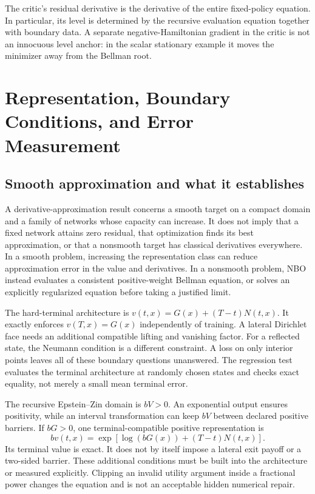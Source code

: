 \documentclass[ecta,nameyear,draft]{econsocart}
\theoremstyle{definition}
\theoremstyle{remark}
\begin{document}
The critic's residual derivative is the derivative of the entire fixed-policy equation. In particular, its level is determined by the recursive evaluation equation together with boundary data. A separate negative-Hamiltonian gradient in the critic is not an innocuous level anchor: in the scalar stationary example it moves the minimizer away from the Bellman root.

\section{Representation, Boundary Conditions, and Error Measurement}
\subsection{Smooth approximation and what it establishes}
A derivative-approximation result concerns a smooth target on a compact domain and a family of networks whose capacity can increase. It does not imply that a fixed network attains zero residual, that optimization finds its best approximation, or that a nonsmooth target has classical derivatives everywhere. In a smooth problem, increasing the representation class can reduce approximation error in the value and derivatives. In a nonsmooth problem, NBO instead evaluates a consistent positive-weight Bellman equation, or solves an explicitly regularized equation before taking a justified limit.

The hard-terminal architecture is $v(t,x)=G(x)+(T-t)N(t,x)$. It exactly enforces $v(T,x)=G(x)$ independently of training. A lateral Dirichlet face needs an additional compatible lifting and vanishing factor. For a reflected state, the Neumann condition is a different constraint. A loss on only interior points leaves all of these boundary questions unanswered. The regression test evaluates the terminal architecture at randomly chosen states and checks exact equality, not merely a small mean terminal error.

The recursive Epstein--Zin domain is $bV>0$. An exponential output ensures positivity, while an interval transformation can keep $bV$ between declared positive barriers. If $bG>0$, one terminal-compatible positive representation is
\[
 bv(t,x)=\exp\left[\log(bG(x))+(T-t)N(t,x)\right].
\]
Its terminal value is exact. It does not by itself impose a lateral exit payoff or a two-sided barrier. These additional conditions must be built into the architecture or measured explicitly. Clipping an invalid utility argument inside a fractional power changes the equation and is not an acceptable hidden numerical repair.
\end{document}
